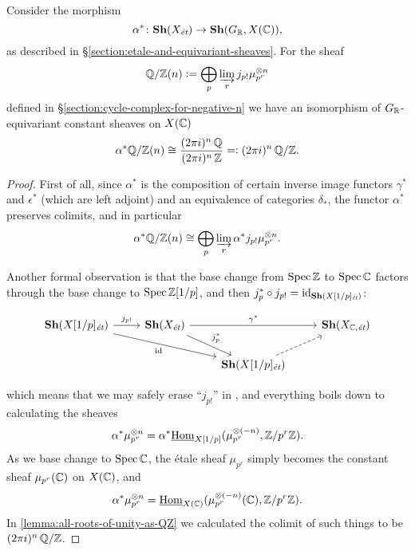 \begin{proposition}
  \label{propn:image-of-QZn-under-alpha}
  Consider the morphism
  \[ \alpha^*\colon \text{\bf Sh} (X_\text{\it ét}) \to
    \text{\bf Sh} (G_{\mathbb{R}}, X (\mathbb{C})), \]
  as described in \S\ref{section:etale-and-equivariant-sheaves}. For the sheaf
  $$\mathbb{Q}/\mathbb{Z} (n) \mathrel{\mathop:}= \bigoplus_p \varinjlim_r  j_{p!} \mu_{p^r}^{\otimes n}$$
  defined in \S\ref{section:cycle-complex-for-negative-n} we have an isomorphism
  of $G_{\mathbb{R}}$-equivariant constant sheaves on $X (\mathbb{C})$
  \[ \alpha^* \mathbb{Q}/\mathbb{Z} (n) \cong
    \frac{(2\pi i)^n\,\mathbb{Q}}{(2\pi i)^n\,\mathbb{Z}}
    =\mathrel{\mathop:} (2\pi i)^n\,\mathbb{Q}/\mathbb{Z}. \]

  \begin{proof}
    First of all, since $\alpha^*$ is the composition of certain inverse image
    functors $\gamma^*$ and $\epsilon^*$ (which are left adjoint) and an
    equivalence of categories $\delta_*$, the functor $\alpha^*$ preserves
    colimits, and in particular
    \begin{equation}
      \label{eqn:alpha-star-commutes-with-colimits}
      \alpha^* \mathbb{Q}/\mathbb{Z} (n) \cong
      \bigoplus_p \varinjlim_r \alpha^* j_{p!} \mu_{p^r}^{\otimes n}.
    \end{equation}

    Another formal observation is that the base change from $\operatorname{Spec} \mathbb{Z}$ to
    $\operatorname{Spec} \mathbb{C}$ factors through the base change to $\operatorname{Spec} \mathbb{Z} [1/p]$, and then
    $j_p^* \circ j_{p!} = \mathrm{id}_{\text{\bf Sh} (X [1/p]_\text{\it ét})}$:

    \[ \begin{tikzcd}
        \categ{Sh} (X [1/p]_\text{\it ét}) \ar{r}{j_{p!}}\ar{drr}[swap]{\idid} & \categ{Sh} (X_\text{\it ét}) \ar{rr}{\gamma^*}\ar{dr}{j_p^*} & & \categ{Sh} (X_{\CC,\text{\it ét}}) \\
        & & \categ{Sh} (X [1/p]_\text{\it ét})\ar[dashed]{ur}
      \end{tikzcd} \]

    \noindent which means that we may safely erase ``$j_{p!}$'' in
    , and everything boils down to
    calculating the sheaves
    \[ \alpha^* \mu_{p^r}^{\otimes n} =
      \alpha^* \underline{\operatorname{Hom}}_{X [1/p]} (\mu_{p^r}^{\otimes (-n)}, \mathbb{Z}/p^r \mathbb{Z}). \]
    As we base change to $\operatorname{Spec} \mathbb{C}$, the étale sheaf $\mu_{p^r}$ simply becomes
    the constant sheaf $\mu_{p^r} (\mathbb{C})$ on $X (\mathbb{C})$, and
    \[ \alpha^* \mu_{p^r}^{\otimes n} =
      \underline{\operatorname{Hom}}_{X (\mathbb{C})} (\mu_{p^r}^{\otimes (-n)} (\mathbb{C}), \mathbb{Z}/p^r \mathbb{Z}). \]
    In \ref{lemma:all-roots-of-unity-as-QZ} we calculated the colimit of such
    things to be $(2\pi i)^n\,\mathbb{Q}/\mathbb{Z}$.
  \end{proof}
\end{proposition}

